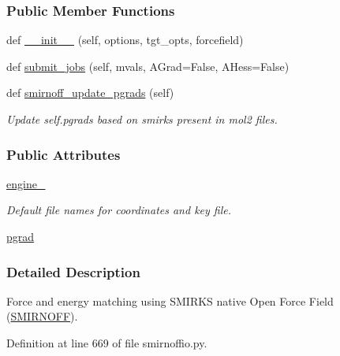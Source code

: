 \subsubsection*{Public Member Functions}
\begin{DoxyCompactItemize}
\item 
def \hyperlink{classsrc_1_1smirnoffio_1_1TorsionProfileTarget__SMIRNOFF_a2803ea982f051e7d2bceedf0b66c226e}{\+\_\+\+\_\+init\+\_\+\+\_\+} (self, options, tgt\+\_\+opts, forcefield)
\item 
def \hyperlink{classsrc_1_1smirnoffio_1_1TorsionProfileTarget__SMIRNOFF_a4a71652fa1206b607250815908368e91}{submit\+\_\+jobs} (self, mvals, A\+Grad=False, A\+Hess=False)
\item 
def \hyperlink{classsrc_1_1smirnoffio_1_1TorsionProfileTarget__SMIRNOFF_ab5d2114016d36c5526bb25a823133ea6}{smirnoff\+\_\+update\+\_\+pgrads} (self)
\begin{DoxyCompactList}\small\item\em Update self.\+pgrads based on smirks present in mol2 files. \end{DoxyCompactList}\end{DoxyCompactItemize}
\subsubsection*{Public Attributes}
\begin{DoxyCompactItemize}
\item 
\hyperlink{classsrc_1_1smirnoffio_1_1TorsionProfileTarget__SMIRNOFF_a223fc7a7784e65adee511af84a927834}{engine\+\_\+}
\begin{DoxyCompactList}\small\item\em Default file names for coordinates and key file. \end{DoxyCompactList}\item 
\hyperlink{classsrc_1_1smirnoffio_1_1TorsionProfileTarget__SMIRNOFF_a62f3149e6c6b25396d4ba7a7748ac6d1}{pgrad}
\end{DoxyCompactItemize}


\subsubsection{Detailed Description}
Force and energy matching using S\+M\+I\+R\+KS native Open Force Field (\hyperlink{classsrc_1_1smirnoffio_1_1SMIRNOFF}{S\+M\+I\+R\+N\+O\+FF}). 



Definition at line 669 of file smirnoffio.\+py.



